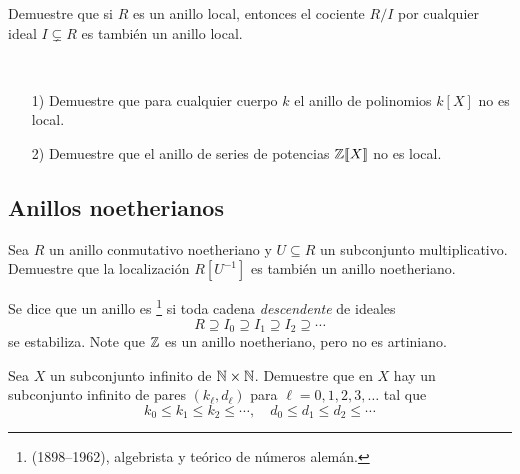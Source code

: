 \begin{ejercicio}
  Demuestre que si $R$ es un anillo local, entonces el cociente $R/I$ por
  cualquier ideal $I\subsetneq R$ es también un anillo local.
\end{ejercicio}

\begin{ejercicio}
  ~

  \begin{enumerate}
  \item[1)] Demuestre que para cualquier cuerpo $k$ el anillo de polinomios
    $k [X]$ no es local.

  \item[2)] Demuestre que el anillo de series de potencias $\mathbb{Z} [\![X]\!]$ no es
    local.
  \end{enumerate}
\end{ejercicio}

\subsection*{Anillos noetherianos}

\begin{ejercicio}
  Sea $R$ un anillo conmutativo noetheriano y $U \subseteq R$ un subconjunto
  multiplicativo. Demuestre que la localización $R [U^{-1}]$ es también
  un anillo noetheriano.
\end{ejercicio}

\begin{ejercicio}
  Se dice que un anillo es \footnote{
    (1898--1962), algebrista y teórico de números alemán.} si toda cadena
  \emph{descendente} de ideales
  $$R \supseteq I_0 \supseteq I_1 \supseteq I_2 \supseteq \cdots$$
  se estabiliza. Note que $\mathbb{Z}$ es un anillo noetheriano, pero no es artiniano.
\end{ejercicio}

\begin{ejercicio}
  \label{ejerc:subconjunto-infinito-de-NxN}
  Sea $X$ un subconjunto infinito de $\mathbb{N}\times\mathbb{N}$. Demuestre que en $X$ hay
  un subconjunto infinito de pares $(k_\ell,d_\ell)$ para
  $\ell = 0,1,2,3,\ldots$ tal que
  $$k_0 \le k_1 \le k_2 \le \cdots, \quad d_0 \le d_1 \le d_2 \le \cdots$$
\end{ejercicio}
